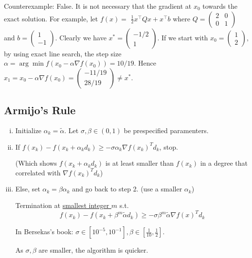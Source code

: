 \documentclass[11pt,a4paper]{article}
\begin{document}
Counterexample: False. It is not necessary that the gradient at $x_{0}$ towards the exact solution. For example, let $f(x)=$ $\frac{1}{2} x^{\top} Q x+x^{\top} b$ where $Q=\left(\begin{array}{ll}2 & 0 \\ 0 & 1\end{array}\right)$ and $b=\left(\begin{array}{c}1 \\ -1\end{array}\right)$. Clearly we have $x^{*}=\left(\begin{array}{c}-1 / 2 \\ 1\end{array}\right)$. If we start with $x_{0}=\left(\begin{array}{l}1 \\ 2\end{array}\right)$, by using exact line search, the step size $\alpha=\arg \min f\left(x_{0}-\alpha \nabla f\left(x_{0}\right)\right)=10 / 19$. Hence $x_{1}=x_{0}-\alpha \nabla f\left(x_{0}\right)=\left(\begin{array}{c}-11 / 19 \\ 28 / 19\end{array}\right) \neq x^{*}$.

\subsection*{Armijo's Rule}
\begin{enumerate}[(i)]
    \item Initialize $\alpha_k=\tilde{\alpha}$. Let $\sigma,\beta \in (0,1)$ be prespecified paramenters.
    \item If $f(x_k)-f(x_k+\alpha_k d_k)\geq-\sigma \alpha_k \nabla f(x_k)^T d_k$, stop.
    
    (Which shows $f(x_k+\alpha_k d_k)$ is at least smaller than $f(x_k)$ in a degree that correlated with $\nabla f(x_k)^T d_k$)
    \item Else, set $\alpha_k=\beta\alpha_k$ and go back to step 2. (use a smaller $\alpha_k$)
    
    Termination at \underline{smallest integer $m$} s.t. $$f(x_k)-f(x_k+\beta^m \tilde{\alpha} d_k)\geq-\sigma\beta^m \tilde{\alpha}\nabla f(x)^T d_k$$

    In Bersekas's book: $\sigma\in[10^{-5},10^{-1}],\beta\in[\frac{1}{10},\frac{1}{2}]$.

    As $\sigma,\beta$ are smaller, the algorithm is quicker.
\end{enumerate}
\end{document}
